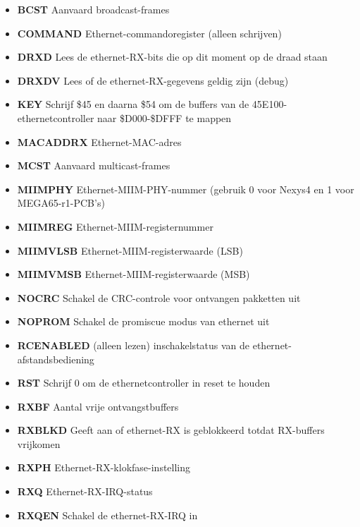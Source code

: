 \begin{itemize}
\item{\bf{BCST}} Aanvaard broadcast-frames
\item{\bf{COMMAND}} Ethernet-commandoregister (alleen schrijven)
\item{\bf{DRXD}} Lees de ethernet-RX-bits die op dit moment op de draad staan
\item{\bf{DRXDV}} Lees of de ethernet-RX-gegevens geldig zijn (debug)
\item{\bf{KEY}} Schrijf \$45 en daarna \$54 om de buffers van de 45E100-ethernetcontroller naar \$D000-\$DFFF te mappen
\item{\bf{MACADDRX}} Ethernet-MAC-adres
\item{\bf{MCST}} Aanvaard multicast-frames
\item{\bf{MIIMPHY}} Ethernet-MIIM-PHY-nummer (gebruik 0 voor Nexys4 en 1 voor MEGA65-r1-PCB's)
\item{\bf{MIIMREG}} Ethernet-MIIM-registernummer
\item{\bf{MIIMVLSB}} Ethernet-MIIM-registerwaarde (LSB)
\item{\bf{MIIMVMSB}} Ethernet-MIIM-registerwaarde (MSB)
\item{\bf{NOCRC}} Schakel de CRC-controle voor ontvangen pakketten uit
\item{\bf{NOPROM}} Schakel de promiscue modus van ethernet uit
\item{\bf{RCENABLED}} (alleen lezen) inschakelstatus van de ethernet-afstandsbediening
\item{\bf{RST}} Schrijf 0 om de ethernetcontroller in reset te houden
\item{\bf{RXBF}} Aantal vrije ontvangstbuffers
\item{\bf{RXBLKD}} Geeft aan of ethernet-RX is geblokkeerd totdat RX-buffers vrijkomen
\item{\bf{RXPH}} Ethernet-RX-klokfase-instelling
\item{\bf{RXQ}} Ethernet-RX-IRQ-status
\item{\bf{RXQEN}} Schakel de ethernet-RX-IRQ in

\end{itemize}
